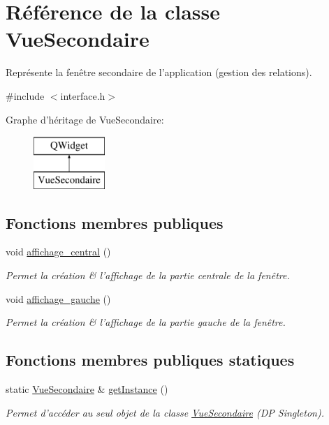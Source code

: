 \hypertarget{class_vue_secondaire}{\section{Référence de la classe Vue\-Secondaire}
\label{class_vue_secondaire}
}


Représente la fenêtre secondaire de l'application (gestion des relations).  




{\ttfamily \#include $<$interface.\-h$>$}

Graphe d'héritage de Vue\-Secondaire\-:\begin{figure}[H]
\begin{center}
\leavevmode
\includegraphics[height=2.000000cm]{class_vue_secondaire}
\end{center}
\end{figure}
\subsection*{Fonctions membres publiques}
\begin{DoxyCompactItemize}
\item 
void \hyperlink{class_vue_secondaire_a79707eb0d8aaddb12d1e1da5b89da844}{affichage\-\_\-central} ()
\begin{DoxyCompactList}\small\item\em Permet la création \& l'affichage de la partie centrale de la fenêtre. \end{DoxyCompactList}\item 
void \hyperlink{class_vue_secondaire_a8af89508ca4dfc46c7474e7fed627400}{affichage\-\_\-gauche} ()
\begin{DoxyCompactList}\small\item\em Permet la création \& l'affichage de la partie gauche de la fenêtre. \end{DoxyCompactList}\end{DoxyCompactItemize}
\subsection*{Fonctions membres publiques statiques}
\begin{DoxyCompactItemize}
\item 
static \hyperlink{class_vue_secondaire}{Vue\-Secondaire} \& \hyperlink{class_vue_secondaire_a455f8674109c95488ca12c8ee6b5861e}{get\-Instance} ()
\begin{DoxyCompactList}\small\item\em Permet d'accéder au seul objet de la classe \hyperlink{class_vue_secondaire}{Vue\-Secondaire} (D\-P Singleton). \end{DoxyCompactList}\end{DoxyCompactItemize}
